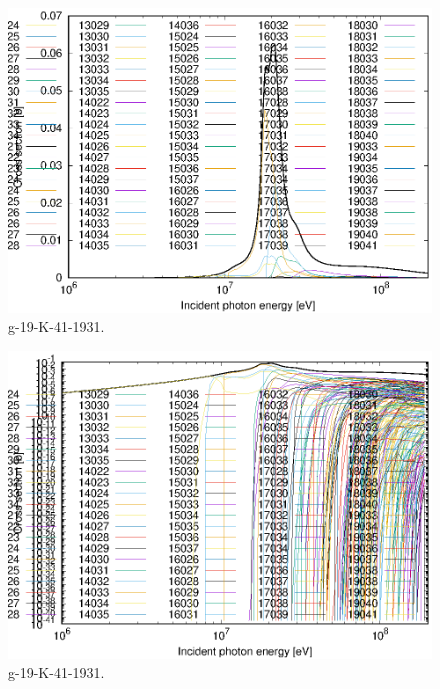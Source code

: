 \begin{figure}
 \includegraphics[width=\linewidth]{eps/g_19-K-41_1931.eps}
  \caption{g-19-K-41-1931.}
\end{figure}
\begin{figure}
 \includegraphics[width=\linewidth]{eps-log/g_19-K-41_1931.eps}
 \caption{g-19-K-41-1931.}
\end{figure}
\newpage \clearpage

